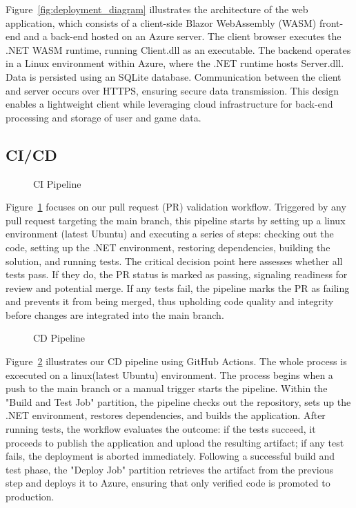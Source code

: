 \documentclass[11pt,a4paper]{article}
\newcommand{\inputdiagram}[1]{}
\newcommand{\textwidthdiagram}[2][1]{%
  \resizebox{#1\textwidth}{!}{\inputdiagram{#2}}%
}
\begin{document}
Figure~\ref{fig:deployment_diagram} illustrates the architecture of the web application,
which consists of a client-side Blazor WebAssembly (WASM) front-end and a back-end hosted on an Azure server. The client browser executes the .NET WASM
runtime, running Client.dll as an executable. The backend operates in a Linux
environment within Azure, where the .NET runtime hosts Server.dll. Data is
persisted using an SQLite database. Communication between the client and
server occurs over HTTPS, ensuring secure data transmission. This design
enables a lightweight client while leveraging cloud infrastructure for
back-end processing and storage of user and game data.

\subsection{CI/CD}

\begin{figure}[H]
        \centering
        \textwidthdiagram[0.8]{CI.tex}
        \caption{CI Pipeline}
        \label{fig:CI_pipeline}
\end{figure}
Figure~\ref{fig:CI_pipeline} focuses on our pull request (PR) validation
workflow. Triggered by any pull request targeting the main branch, this
pipeline starts by setting up a linux environment (latest Ubuntu) and
executing a series of steps: checking out the code, setting up the .NET
environment, restoring dependencies, building the solution, and running
tests. The critical decision point here assesses whether all tests pass. If
they do, the PR status is marked as passing, signaling readiness for review
and potential merge. If any tests fail, the pipeline marks the PR as failing
and prevents it from being merged, thus upholding code quality and integrity
before changes are integrated into the main branch.

\begin{figure}[H]
    \centering
    \textwidthdiagram[0.8]{CD.tex}
    \caption{CD Pipeline}
    \label{fig:CD_pipeline}
\end{figure}
Figure~\ref{fig:CD_pipeline} illustrates our CD pipeline using GitHub
Actions. The whole process is excecuted on a linux(latest Ubuntu)
environment. The process begins when a push to the main branch or a manual
trigger starts the pipeline. Within the "Build and Test Job" partition,
the pipeline checks out the repository, sets up the .NET environment,
restores dependencies, and builds the application. After running tests,
the workflow evaluates the outcome: if the tests succeed, it proceeds to
publish the application and upload the resulting artifact; if any test fails,
the deployment is aborted immediately. Following a successful build and test
phase, the "Deploy Job" partition retrieves the artifact from the previous
step and deploys it to Azure, ensuring that only verified code is promoted
to production.
\end{document}
